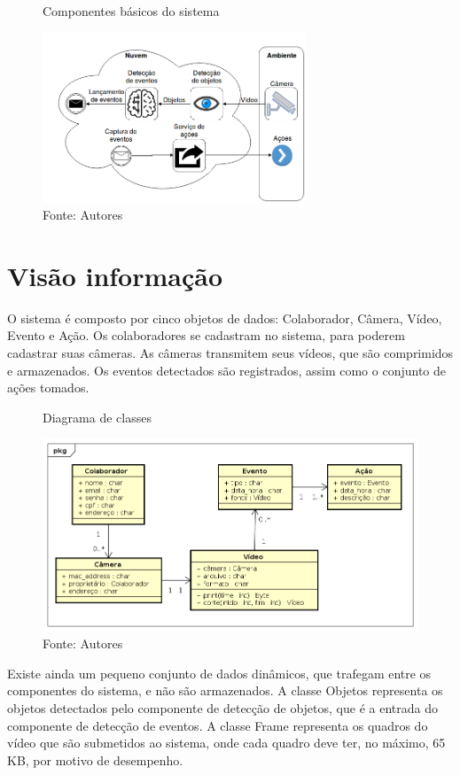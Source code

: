 \documentclass[]{politex}
\begin{document}
\begin{figure}[H]
    \centering
    \caption{Componentes básicos do sistema}
    \includegraphics[width=0.7\textwidth]{Componentes_basicos}
    \caption*{Fonte: Autores}
    \label{fig:componentes}
\end{figure}

\section{Visão informação}
O sistema é composto por cinco objetos de dados: Colaborador, Câmera, Vídeo, Evento e Ação. Os colaboradores se cadastram no sistema, para poderem cadastrar suas câmeras. As câmeras transmitem seus vídeos, que são comprimidos e armazenados. Os eventos detectados são registrados, assim como o conjunto de ações tomados.

\begin{figure}[H]
    \centering
    \caption{Diagrama de classes}
    \includegraphics[width=\textwidth]{Visao_informacao_total}
    \caption*{Fonte: Autores}
    \label{fig:classeVisao}
\end{figure}

Existe ainda um pequeno conjunto de dados dinâmicos, que trafegam entre os componentes do sistema, e não são armazenados. A classe Objetos representa os objetos detectados pelo componente de detecção de objetos, que é a entrada do componente de detecção de eventos. A classe Frame representa os quadros do vídeo que são submetidos ao sistema, onde cada quadro deve ter, no máximo, 65 KB, por motivo de desempenho.
\end{document}
